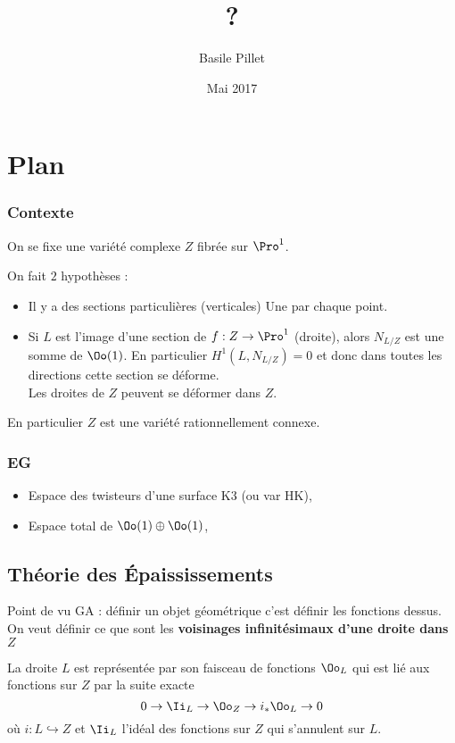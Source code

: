 \documentclass[a4paper]{amsart}
\author{Basile Pillet}
\date{Mai 2017}
\title{?}
\begin{document}
\maketitle
\tableofcontents


\section{Plan}
\label{sec:orgheadline19}

\subsubsection{Contexte}
\label{sec:orgheadline1}
On se fixe une variété complexe \(Z\) fibrée sur \(\Pro^1\).

On fait \(2\) hypothèses :
\begin{itemize}
\item Il y a des sections particulières (verticales)
Une par chaque point.
\item Si \(L\) est l'image d'une section de \(f : Z \to \Pro^1\) (droite), alors 
\(N_{L/Z}\) est une somme de \(\Oo(1)\).
En particulier \(H^1(L,N_{L/Z}) = 0\) et donc dans toutes les directions cette section se déforme.\\
Les droites de \(Z\) peuvent se déformer dans \(Z\).
\end{itemize}

En particulier \(Z\) est une variété rationnellement connexe.

\subsubsection{EG}
\label{sec:orgheadline2}
\begin{itemize}
\item Espace des twisteurs d'une surface K3 (ou var HK),
\item Espace total de \(\Oo(1) \oplus \Oo(1)\),
\end{itemize}


\subsection{Théorie des Épaississements}
\label{sec:orgheadline8}
Point de vu GA : définir un objet géométrique c'est définir les fonctions dessus. On veut définir ce que sont les \textbf{voisinages infinitésimaux d'une droite dans \(Z\)}

La droite \(L\) est représentée par son faisceau de fonctions \(\Oo_L\) qui est lié aux fonctions sur \(Z\) par la suite exacte
\[
0 \to \Ii_L \to \Oo_Z \to i_* \Oo_L \to 0
\]
où \(i : L \hookrightarrow Z\) et \(\Ii_L\) l'idéal des fonctions sur \(Z\) qui s'annulent sur \(L\).
\end{document}

